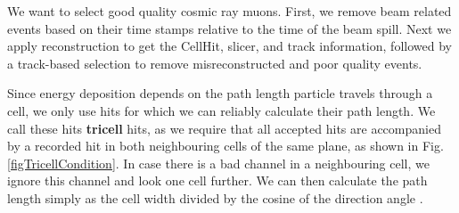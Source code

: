We want to select good quality cosmic ray muons. First, we remove beam related events based on their time stamps relative to the time of the beam spill. Next we apply reconstruction to get the CellHit, slicer, and track information, followed by a track-based selection to remove misreconstructed and poor quality events.

Since energy deposition depends on the path length particle travels through a cell, we only use hits for which we can reliably calculate their path length. We call these hits \textbf{tricell} hits, as we require that all accepted hits are accompanied by a recorded hit in both neighbouring cells of the same plane, as shown in Fig. \ref{figTricellCondition}. In case there is a bad channel in a neighbouring cell, we ignore this channel and look one cell further. We can then calculate the path length simply as the cell width divided by the cosine of the direction angle \cite{NOVA-doc-13579,NOVA-doc-7410}.

